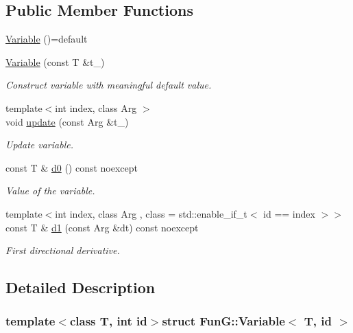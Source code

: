 \subsection*{Public Member Functions}
\begin{DoxyCompactItemize}
\item 
\hyperlink{structFunG_1_1Variable_a20d207e651ee9e93c86dfa4ea1053f56}{Variable} ()=default
\item 
\hyperlink{structFunG_1_1Variable_a10238450dac2ec4c98400b106543ff8f}{Variable} (const T \&t\+\_\+)
\begin{DoxyCompactList}\small\item\em Construct variable with meaningful default value. \end{DoxyCompactList}\item 
{\footnotesize template$<$int index, class Arg $>$ }\\void \hyperlink{structFunG_1_1Variable_a50f4d34586aa6a89df604503e0a3c2a9}{update} (const Arg \&t\+\_\+)
\begin{DoxyCompactList}\small\item\em Update variable. \end{DoxyCompactList}\item 
const T \& \hyperlink{structFunG_1_1Variable_a8253be17d26f9070da92635a8e6d410f}{d0} () const noexcept
\begin{DoxyCompactList}\small\item\em Value of the variable. \end{DoxyCompactList}\item 
{\footnotesize template$<$int index, class Arg , class  = std\+::enable\+\_\+if\+\_\+t$<$ id == index $>$$>$ }\\const T \& \hyperlink{structFunG_1_1Variable_a9384160b4015767ffe6a058583fef10a}{d1} (const Arg \&dt) const noexcept
\begin{DoxyCompactList}\small\item\em First directional derivative. \end{DoxyCompactList}\end{DoxyCompactItemize}


\subsection{Detailed Description}
\subsubsection*{template$<$class T, int id$>$struct Fun\+G\+::\+Variable$<$ T, id $>$}

